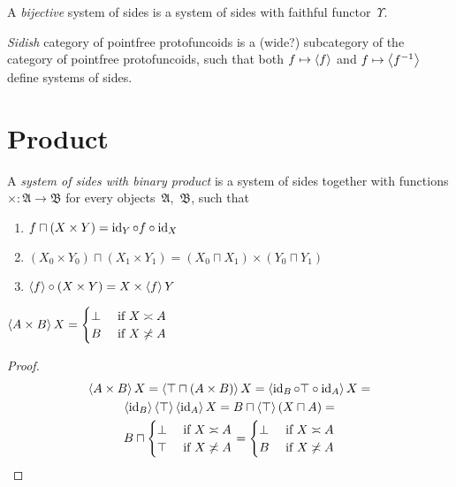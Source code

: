 
\begin{defn}
A \emph{bijective} system of sides is a system of sides with faithful functor~$\Upsilon$.
\end{defn}

\begin{defn}
\emph{Sidish} category of pointfree protofuncoids is a (wide?) subcategory of the category of pointfree protofuncoids,
such that both $f\mapsto\left\langle f\right\rangle$ and $f\mapsto\left\langle f^{-1}\right\rangle$ define systems of sides.
\end{defn}

\section{Product}

\begin{defn}
A \emph{system of sides with binary product} is a system of sides together with functions $\mathord{\times}:\mathfrak{A}\rightarrow\mathfrak{B}$
for every objects~$\mathfrak{A}$,~$\mathfrak{B}$, such that
\begin{enumerate}
\item \label{f-c-x-y}$f\sqcap(X\times Y) = \operatorname{id}_Y\circ f\circ\operatorname{id}_X$
\item \label{f-xy-x0y0}$(X_0\times Y_0)\sqcap(X_1\times Y_1) = (X_0\sqcap X_1)\times(Y_0\sqcap Y_1)$
\item $\left\langle f\right\rangle\circ(X\times Y) = X\times\left\langle f\right\rangle Y$
\end{enumerate}
\end{defn}

\begin{prop}
$\left\langle A\times B\right\rangle X = \begin{cases}\bot&\text{ if }X\asymp A\\B&\text{ if }X\not\asymp A\end{cases}$
\end{prop}

\begin{proof}
~
\begin{multline*}
\left\langle A\times B\right\rangle X = \left\langle \top\sqcap(A\times B)\right\rangle X = \left\langle \operatorname{id}_B\circ\top\circ\operatorname{id}_A\right\rangle X = \\
\left\langle \operatorname{id}_B\right\rangle\left\langle \top\right\rangle\left\langle \operatorname{id}_A\right\rangle X =
B\sqcap\left\langle \top\right\rangle(X\sqcap A) = \\
B\sqcap\begin{cases}\bot&\text{ if }X\asymp A\\\top&\text{ if }X\not\asymp A\end{cases} =
\begin{cases}\bot&\text{ if }X\asymp A\\B&\text{ if }X\not\asymp A\end{cases}
\end{multline*}
\end{proof}

